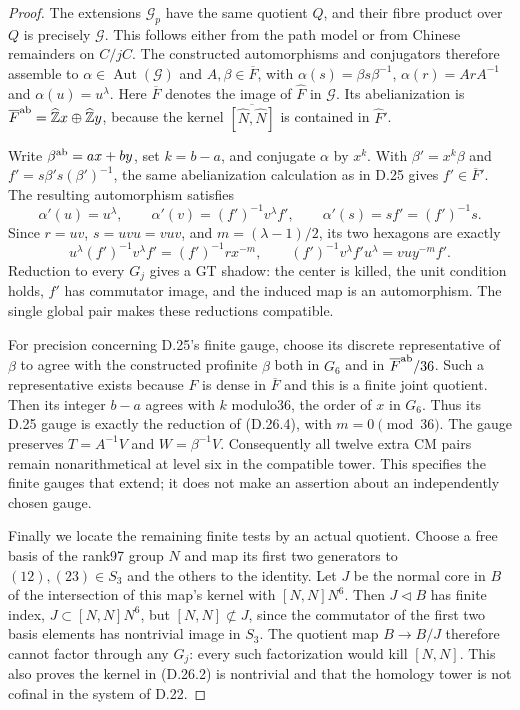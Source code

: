 \begin{proof}
The extensions $\mathcal G_p$ have the same quotient $Q$,
and their fibre product over $Q$ is precisely $\mathcal G$.
This follows either from the path model or from Chinese
remainders on $C/jC$. The constructed automorphisms and
conjugators therefore assemble to $\alpha\in
\operatorname{Aut}(\mathcal G)$ and $A,\beta\in\overline F$,
with $\alpha(s)=\beta s\beta^{-1}$,
$\alpha(r)=ArA^{-1}$ and $\alpha(u)=u^\lambda$.
Here $\overline F$ denotes the image of $\widehat F$ in
$\mathcal G$. Its abelianization is
$\overline F^{\rm ab}=\widehat{\mathbb Z}x\oplus
\widehat{\mathbb Z}y$, because the kernel
$\overline{[\widehat N,\widehat N]}$ is contained in
$\widehat F'$.

Write $\beta^{\rm ab}=ax+by$, set $k=b-a$, and conjugate
$\alpha$ by $x^k$. With $\beta'=x^k\beta$ and
$f'=s\beta's(\beta')^{-1}$, the same abelianization
calculation as in D.25 gives $f'\in\overline F'$.
The resulting automorphism satisfies
\[
 \alpha'(u)=u^\lambda,\qquad
 \alpha'(v)=(f')^{-1}v^\lambda f',\qquad
 \alpha'(s)=sf'=(f')^{-1}s.                             \tag{D.26.4}
\]
Since $r=uv$, $s=uvu=vuv$, and $m=(\lambda-1)/2$, its
two hexagons are exactly
\[
 u^\lambda(f')^{-1}v^\lambda f'=(f')^{-1}r x^{-m},\qquad
 (f')^{-1}v^\lambda f'u^\lambda=vu y^{-m}f'.             \tag{D.26.5}
\]
Reduction to every $G_j$ gives a GT shadow: the center is
killed, the unit condition holds, $f'$ has commutator image,
and the induced map is an automorphism. The single global
pair makes these reductions compatible.

For precision concerning D.25's finite gauge, choose its
discrete representative of $\beta$ to agree with the
constructed profinite $\beta$ both in $G_6$ and in
$\overline F^{\rm ab}/36$. Such a representative exists
because $F$ is dense in $\overline F$ and this is a finite
joint quotient. Then its integer $b-a$ agrees with $k$
modulo36, the order of $x$ in $G_6$. Thus its D.25 gauge
is exactly the reduction of (D.26.4), with $m=0\pmod{36}$.
The gauge preserves $T=A^{-1}V$ and $W=\beta^{-1}V$.
Consequently all twelve extra CM pairs remain
nonarithmetical at level six in the compatible tower.
This specifies the finite gauges that extend; it does not
make an assertion about an independently chosen gauge.

Finally we locate the remaining finite tests by an actual
quotient. Choose a free basis of the rank97 group $N$ and
map its first two generators to $(12),(23)\in S_3$ and
the others to the identity. Let $J$ be the normal core in
$B$ of the intersection of this map's kernel with
$[N,N]N^6$. Then $J\triangleleft B$ has finite index,
$J\subset[N,N]N^6$, but $[N,N]\not\subset J$, since
the commutator of the first two basis elements has nontrivial
image in $S_3$. The quotient map $B\to B/J$ therefore
cannot factor through any $G_j$: every such factorization
would kill $[N,N]$. This also proves the kernel in
(D.26.2) is nontrivial and that the homology tower is not
cofinal in the system of D.22.


\end{proof}
